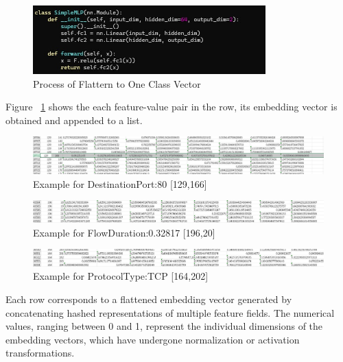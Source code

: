 \begin{ZhChapter}
    \begin{figure}[htbp]
        \centering
        \includegraphics[width = 0.8\textwidth]{image/flattern.jpg}
        \caption{Process of Flattern to One Class Vector}
        \label{fig:FF}
    \end{figure}

    Figure ~\ref{fig:FF} shows the each feature-value pair in the row, its embedding vector is obtained and appended to a list.


    \begin{figure}[htbp]
        \centering
        \includegraphics[width = 1\textwidth]{image/129_166.jpg}
        \caption{Example for DestinationPort:80 [129,166]}
        \label{fig:vector}
    \end{figure}
    \begin{figure}[htbp]
        \centering
        \includegraphics[width = 1\textwidth]{image/196_20.jpg}
        \caption{Example for FlowDuration:0.32817 [196,20]}
        \label{fig:vector}
    \end{figure}

    \begin{figure}[htbp]
        \centering
        \includegraphics[width = 1\textwidth]{image/164_202.jpg}
        \caption{Example for ProtocolType:TCP [164,202]}
        \label{fig:vector}
    \end{figure}

    Each row corresponds to a flattened embedding vector generated by concatenating hashed representations of multiple feature fields. The numerical values, ranging between 0 and 1, represent the individual dimensions of the embedding vectors, which have undergone normalization or activation transformations.


\end{ZhChapter}
